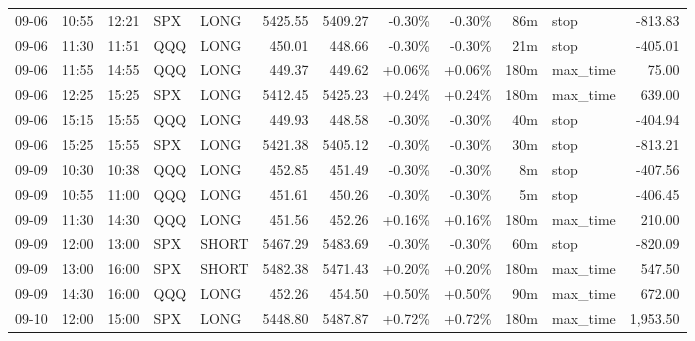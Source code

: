 \documentclass[11pt,a4paper,twoside]{article}
\begin{document}
\begin{center}
\begin{longtable}{>{\color{txtmain}}l l l l l r r r r r >{\color{txtmain}}l r}
09-06 & 10:55 & 12:21 & SPX & LONG & 5425.55 & 5409.27 & \textcolor{lossred}{-0.30\%} & \textcolor{lossred}{-0.30\%} & 86m & stop & \textcolor{lossred}{-813.83} \\
09-06 & 11:30 & 11:51 & QQQ & LONG & 450.01 & 448.66 & \textcolor{lossred}{-0.30\%} & \textcolor{lossred}{-0.30\%} & 21m & stop & \textcolor{lossred}{-405.01} \\
09-06 & 11:55 & 14:55 & QQQ & LONG & 449.37 & 449.62 & \textcolor{wingreen}{+0.06\%} & \textcolor{wingreen}{+0.06\%} & 180m & max\_time & \textcolor{wingreen}{75.00} \\
09-06 & 12:25 & 15:25 & SPX & LONG & 5412.45 & 5425.23 & \textcolor{wingreen}{+0.24\%} & \textcolor{wingreen}{+0.24\%} & 180m & max\_time & \textcolor{wingreen}{639.00} \\
09-06 & 15:15 & 15:55 & QQQ & LONG & 449.93 & 448.58 & \textcolor{lossred}{-0.30\%} & \textcolor{lossred}{-0.30\%} & 40m & stop & \textcolor{lossred}{-404.94} \\
09-06 & 15:25 & 15:55 & SPX & LONG & 5421.38 & 5405.12 & \textcolor{lossred}{-0.30\%} & \textcolor{lossred}{-0.30\%} & 30m & stop & \textcolor{lossred}{-813.21} \\
09-09 & 10:30 & 10:38 & QQQ & LONG & 452.85 & 451.49 & \textcolor{lossred}{-0.30\%} & \textcolor{lossred}{-0.30\%} & 8m & stop & \textcolor{lossred}{-407.56} \\
09-09 & 10:55 & 11:00 & QQQ & LONG & 451.61 & 450.26 & \textcolor{lossred}{-0.30\%} & \textcolor{lossred}{-0.30\%} & 5m & stop & \textcolor{lossred}{-406.45} \\
09-09 & 11:30 & 14:30 & QQQ & LONG & 451.56 & 452.26 & \textcolor{wingreen}{+0.16\%} & \textcolor{wingreen}{+0.16\%} & 180m & max\_time & \textcolor{wingreen}{210.00} \\
09-09 & 12:00 & 13:00 & SPX & SHORT & 5467.29 & 5483.69 & \textcolor{lossred}{-0.30\%} & \textcolor{lossred}{-0.30\%} & 60m & stop & \textcolor{lossred}{-820.09} \\
09-09 & 13:00 & 16:00 & SPX & SHORT & 5482.38 & 5471.43 & \textcolor{wingreen}{+0.20\%} & \textcolor{wingreen}{+0.20\%} & 180m & max\_time & \textcolor{wingreen}{547.50} \\
09-09 & 14:30 & 16:00 & QQQ & LONG & 452.26 & 454.50 & \textcolor{wingreen}{+0.50\%} & \textcolor{wingreen}{+0.50\%} & 90m & max\_time & \textcolor{wingreen}{672.00} \\
09-10 & 12:00 & 15:00 & SPX & LONG & 5448.80 & 5487.87 & \textcolor{wingreen}{+0.72\%} & \textcolor{wingreen}{+0.72\%} & 180m & max\_time & \textcolor{wingreen}{1,953.50} \\

\end{longtable}
\end{center}
\end{document}
